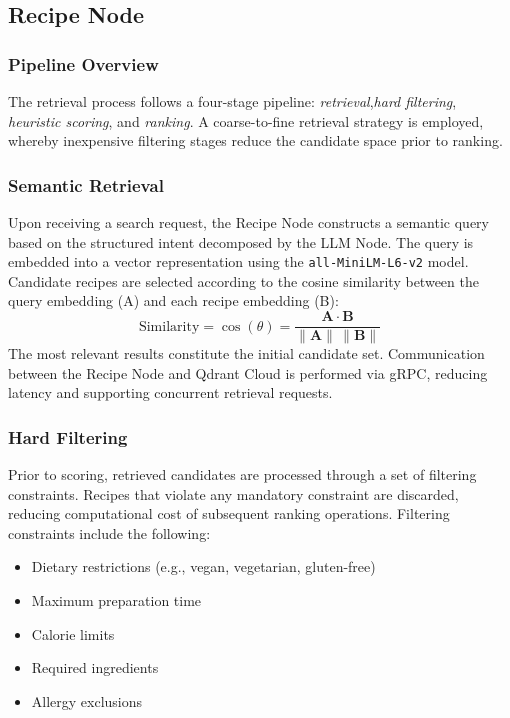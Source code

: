 \documentclass[conference]{IEEEtran}
\begin{document}
\subsection{Recipe Node}
\label{sec:recipenode}
\subsubsection{Pipeline Overview}
The retrieval process follows a four-stage pipeline: \emph{retrieval},\emph{hard filtering}, \emph{heuristic scoring}, and \emph{ranking}. A coarse-to-fine retrieval strategy is employed, whereby inexpensive filtering stages reduce the candidate space prior to ranking.

\subsubsection{Semantic Retrieval}
Upon receiving a search request, the Recipe Node constructs a semantic query based on the structured intent decomposed by the LLM Node. The query is embedded into a vector representation using the \texttt{all-MiniLM-L6-v2} model. Candidate recipes are selected according to the cosine similarity between the query embedding (A) and each recipe embedding (B):
\[
\mathrm{Similarity} = \cos(\theta) = \frac{\mathbf{A} \cdot \mathbf{B}}{\|\mathbf{A}\| \, \|\mathbf{B}\|}
\]
The most relevant results constitute the initial candidate set. Communication between the Recipe Node and Qdrant Cloud is performed via gRPC, reducing latency and supporting concurrent retrieval requests. 

\subsubsection{ Hard Filtering}
Prior to scoring, retrieved candidates are processed through a set of filtering constraints.
Recipes that violate any mandatory constraint are discarded, reducing computational cost of
subsequent ranking operations. Filtering constraints include the following:
\begin{itemize}
    \item Dietary restrictions (e.g., vegan, vegetarian, gluten-free)
    \item Maximum preparation time
    \item Calorie limits
    \item Required ingredients
    \item Allergy exclusions
\end{itemize}
\end{document}
